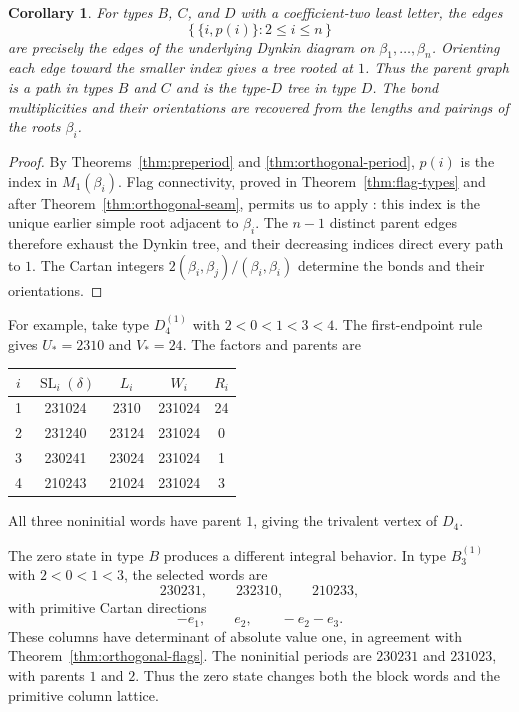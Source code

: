 \documentclass[11pt]{amsart}
\numberwithin{equation}{section}
\newtheorem{corollary}[theorem]{Corollary}
\theoremstyle{definition}
\DeclareMathOperator{\SL}{SL}
\begin{document}
\begin{corollary}\label{cor:parent-tree}
For types $B$, $C$, and $D$ with a coefficient-two least letter, the edges
\[
 \{\,\{i,p(i)\}:2\leq i\leq n\,\}
\]
are precisely the edges of the underlying Dynkin diagram on $\beta_1,\ldots,\beta_n$. Orienting each edge toward the smaller index gives a tree rooted at $1$. Thus the parent graph is a path in types $B$ and $C$ and is the type-$D$ tree in type $D$. The bond multiplicities and their orientations are recovered from the lengths and pairings of the roots $\beta_i$.
\end{corollary}
\begin{proof}
By Theorems~\ref{thm:preperiod} and \ref{thm:orthogonal-period}, $p(i)$ is the index in $M_1(\beta_i)$. Flag connectivity, proved in Theorem~\ref{thm:flag-types} and after Theorem~\ref{thm:orthogonal-seam}, permits us to apply \cite[Lemma~4.32]{ETC}: this index is the unique earlier simple root adjacent to $\beta_i$. The $n-1$ distinct parent edges therefore exhaust the Dynkin tree, and their decreasing indices direct every path to $1$. The Cartan integers $2(\beta_i,\beta_j)/(\beta_i,\beta_i)$ determine the bonds and their orientations.
\end{proof}

For example, take type $D_4^{(1)}$ with $2<0<1<3<4$. The first-endpoint rule gives $U_*=2310$ and $V_*=24$. The factors and parents are
\begin{center}
\begin{tabular}{ccccc}
\toprule
$i$ & $\SL_i(\delta)$ & $L_i$ & $W_i$ & $R_i$\\
\midrule
1 & 231024 & 2310 & 231024 & 24\\
2 & 231240 & 23124 & 231024 & 0\\
3 & 230241 & 23024 & 231024 & 1\\
4 & 210243 & 21024 & 231024 & 3\\
\bottomrule
\end{tabular}
\end{center}
All three noninitial words have parent $1$, giving the trivalent vertex of $D_4$.

The zero state in type $B$ produces a different integral behavior. In type $B_3^{(1)}$ with $2<0<1<3$, the selected words are
\[
 230231,\qquad232310,\qquad210233,
\]
with primitive Cartan directions
\[
 -e_1,\qquad e_2,\qquad-e_2-e_3.
\]
These columns have determinant of absolute value one, in agreement with Theorem~\ref{thm:orthogonal-flags}. The noninitial periods are $230231$ and $231023$, with parents $1$ and $2$. Thus the zero state changes both the block words and the primitive column lattice.
\end{document}

